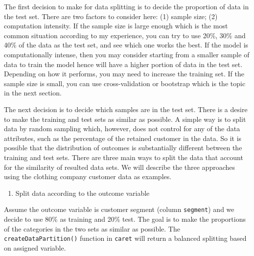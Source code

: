 \documentclass[12pt,]{krantz}
\makeatletter
\newenvironment{Shaded}{\begin{snugshade}}{\end{snugshade}}
\newcommand{\CommentTok}[1]{\textcolor[rgb]{0.37,0.37,0.37}{\textit{#1}}}
\newcommand{\DataTypeTok}[1]{\textcolor[rgb]{0.27,0.27,0.27}{#1}}
\newcommand{\DecValTok}[1]{\textcolor[rgb]{0.06,0.06,0.06}{#1}}
\newcommand{\FloatTok}[1]{\textcolor[rgb]{0.06,0.06,0.06}{#1}}
\newcommand{\KeywordTok}[1]{\textcolor[rgb]{0.27,0.27,0.27}{\textbf{#1}}}
\newcommand{\NormalTok}[1]{#1}
\newcommand{\OperatorTok}[1]{\textcolor[rgb]{0.43,0.43,0.43}{\textbf{#1}}}
\newcommand{\OtherTok}[1]{\textcolor[rgb]{0.37,0.37,0.37}{#1}}
\newcommand{\StringTok}[1]{\textcolor[rgb]{0.5,0.5,0.5}{#1}}
\providecommand{\tightlist}{%
  \setlength{\itemsep}{0pt}\setlength{\parskip}{0pt}}
\newenvironment{kframe}{%
\medskip{}
\setlength{\fboxsep}{.8em}
 \def\at@end@of@kframe{}%
 \ifinner\ifhmode%
  \def\at@end@of@kframe{\end{minipage}}%
  \begin{minipage}{\columnwidth}%
 \fi\fi%
 \def\FrameCommand##1{\hskip\@totalleftmargin \hskip-\fboxsep
 \colorbox{shadecolor}{##1}\hskip-\fboxsep
     \hskip-\linewidth \hskip-\@totalleftmargin \hskip\columnwidth}%
 \MakeFramed {\advance\hsize-\width
   \@totalleftmargin\z@ \linewidth\hsize
   \@setminipage}}%
 {\par\unskip\endMakeFramed%
 \at@end@of@kframe}
\renewenvironment{Shaded}{\begin{kframe}}{\end{kframe}}
\makeatother
\begin{document}
The first decision to make for data splitting is to decide the proportion of data in the test set. There are two factors to consider here: (1) sample size; (2) computation intensity. If the sample size is large enough which is the most common situation according to my experience, you can try to use 20\%, 30\% and 40\% of the data as the test set, and see which one works the best. If the model is computationally intense, then you may consider starting from a smaller sample of data to train the model hence will have a higher portion of data in the test set. Depending on how it performs, you may need to increase the training set. If the sample size is small, you can use cross-validation or bootstrap which is the topic in the next section.

The next decision is to decide which samples are in the test set. There is a desire to make the training and test sets as similar as possible. A simple way is to split data by random sampling which, however, does not control for any of the data attributes, such as the percentage of the retained customer in the data. So it is possible that the distribution of outcomes is substantially different between the training and test sets. There are three main ways to split the data that account for the similarity of resulted data sets. We will describe the three approaches using the clothing company customer data as examples.

\begin{enumerate}
\def\labelenumi{(\arabic{enumi})}
\tightlist
\item
  Split data according to the outcome variable
\end{enumerate}

Assume the outcome variable is customer segment (column \texttt{segment}) and we decide to use 80\% as training and 20\% test. The goal is to make the proportions of the categories in the two sets as similar as possible. The \texttt{createDataPartition()} function in \texttt{caret} will return a balanced splitting based on assigned variable.

\begin{Shaded}
\end{Shaded}
\end{document}
